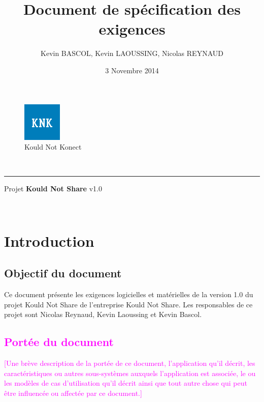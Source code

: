 \documentclass[10pt,a4paper]{report}
\author{Kevin BASCOL, Kevin LAOUSSING, Nicolas REYNAUD}
\title{Document de spécification des exigences}
\date{3 Novembre 2014}
\begin{document}
\makeatletter
	\begin{titlepage}
	
	\begin{figure}
		\begin{minipage}[c]{.46\linewidth}
		\end{minipage} \hfill
		\begin{minipage}[c]{.20\linewidth}
			\begin{center}
				\includegraphics{knk.png}\\
				{\large Kould Not Konect}
			\end{center}
		\end{minipage}
	\vspace{1cm}
	\end{figure}
	
	\centering
		{\Huge \textbf{\@title}}\\
		\hrule height 4pt
		\vspace{1.5cm}
		{\LARGE  Projet \textbf{Kould Not Share} v1.0}
		
		\vfill
		
		\@author\\
		\@date 
		\end{titlepage}
\makeatother
\setcounter{secnumdepth}{4}
\setcounter{tocdepth}{4}
\renewcommand{\contentsname}{Sommaire}
\tableofcontents
\thispagestyle{empty}
\setcounter{page}{0}
\newpage


\section{Introduction}

\subsection{Objectif du document}
Ce document présente les exigences logicielles et matérielles de la version 1.0 du projet Kould Not Share de l'entreprise Kould Not Share. Les responsables de ce projet sont Nicolas Reynaud, Kevin Laoussing et Kevin Bascol.

\textcolor{magenta}{\subsection{Portée du document}
[Une brève description de la portée de ce document, l’application qu’il décrit, les caractéristiques ou autres sous-systèmes auxquels l’application est associée, le ou les modèles de cas d’utilisation qu’il décrit ainsi que tout autre chose qui peut être influencée ou affectée par ce document.]}
\end{document}
